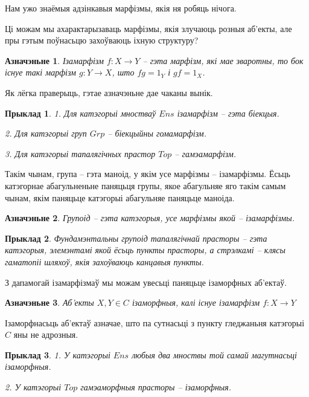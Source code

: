 \documentclass[a4paper,12pt]{book}
\newtheorem{example}{Прыклад}[section]
\newtheorem{definition}{Азначэньне}[section]
\begin{document}
Нам ужо знаёмыя адзінкавыя марфізмы, якія ня робяць нічога.

Ці можам мы ахарактарызаваць марфізмы, якія злучаюць розныя аб'екты,
але пры гэтым поўнасьцю захоўваюць іхную структуру?

\begin{definition}
  Ізамарфізм $f: X \rightarrow Y$ -- гэта марфізм, які мае зваротны,
  то бок існуе такі марфізм $g: Y \rightarrow X$, што $fg = 1_Y$ і $gf
  = 1_X$.
\end{definition}

Як лёгка праверыць, гэтае азначэньне дае чаканы вынік.

\begin{example}
  1. Для катэгорыі мностваў $Ens$ ізамарфізм -- гэта біекцыя.

  2. Для катэгорыі груп $Grp$ -- біекцыйны гомамарфізм.

  3. Для катэгорыі тапалягічных прастор $Top$ -- гамэамарфізм.
\end{example}

Такім чынам, група -- гэта маноід, у якім усе марфізмы --
ізамарфізмы. Ёсьць катэгорнае абагульненьне паняцьця групы, якое
абагульняе яго такім самым чынам, якім паняцьце катэгорыі абагульняе
паняцьце маноіда.

\begin{definition}
  Групоід -- гэта катэгорыя, усе марфізмы якой -- ізамарфізмы.
\end{definition}

\begin{example}
  Фундамэнтальны групоід тапалягічнай прасторы -- гэта катэгорыя,
  элемэнтамі якой ёсьць пункты прасторы, а стрэлкамі -- клясы
  гаматопіі шляхоў, якія захоўваюць канцавыя пункты.
\end{example}

З дапамогай ізамарфізмаў мы можам увесьці паняцьце ізаморфных
аб'ектаў.

\begin{definition}
  Аб'екты $X, Y \in C$ ізаморфныя, калі існуе ізамарфізм $f: X
  \rightarrow Y$
\end{definition}

Ізаморфнасьць аб'ектаў азначае, што па сутнасьці з пункту гледжаньня
катэгорыі $C$ яны не адрозныя.

\begin{example}
  1. У катэгорыі $Ens$ любыя два мноствы той самай магутнасьці
  ізаморфныя.

  2. У катэгорыі $Top$ гамэаморфныя прасторы -- ізаморфныя.
\end{example}
\end{document}
